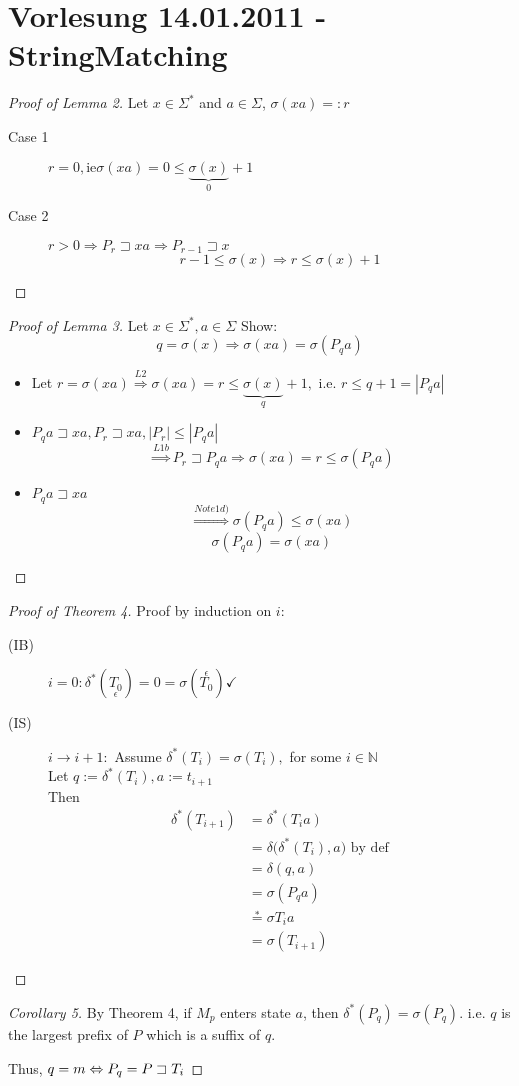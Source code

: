 \documentclass[12pt,oneside,a4paper,parskip=on,fleqn]{scrartcl}
\newcommand{\Ra}{\Rightarrow}
\begin{document}
\section*{Vorlesung 14.01.2011 - StringMatching} %
\label{sec:vorlesung_14_01_2011}
	
	\begin{proof}[Proof of Lemma 2]
		Let $x\in \Sigma^*$ and $a\in \Sigma$, $\sigma(xa) =: r$
		\begin{description}
			\item[Case 1] \( r=0,\text{ie} \sigma(xa) = 0 \leq \underbrace{\sigma(x)}_{0} + 1\)
			\item[Case 2] $r>0 \Rightarrow P_r\sqsupset xa \Rightarrow P_{r-1} \sqsupset x$
			\[
				r-1 \leq \sigma(x) \Rightarrow r\leq \sigma(x) + 1
			\]
		\end{description}
	\end{proof}

	\begin{proof}[Proof of Lemma 3]
		Let $x\in \Sigma^{*}, a\in \Sigma$
		Show: \[
			q=\sigma(x) \Ra \sigma(xa) = \sigma(P_q a)
		\]
		\begin{itemize}
			\item Let $r=\sigma(xa) \overset{L2}{\Ra} \sigma(xa) = r \leq \underbrace{\sigma(x)}_{q} +1,$ i.e. $r\leq q+1 = |P_q a|$
			\item $P_q a \sqsupset xa, P_r \sqsupset xa, |P_r| \leq |P_q a|$
			\[
				\overset{L1b}{\Ra} P_r \sqsupset P_q a \Ra \sigma(xa) = r \leq \sigma(P_q a)
			\]
			\item $P_q a \sqsupset xa$
			\[
				\overset{Note 1d)}{\Ra} \sigma(P_q a) \leq \sigma(xa)
			\]
			\[
				\sigma(P_q a) = \sigma(xa)
			\]
		\end{itemize}
	\end{proof}

	\begin{proof}[Proof of Theorem 4]
		Proof by induction on $i$:
		\begin{description}
			\item[(IB)] $i=0: \delta^*(\underset{\epsilon}{T_0}) = 0 = \sigma(\overset{\epsilon}{T_0}) \checkmark$
			\item[(IS)] $i\to i+1:$ Assume $\delta^*(T_i) = \sigma(T_i),$ for some $i\in\mathbb{N}$\\
			Let $q:= \delta^*(T_i), a:= t_{i+1}$\\
			Then\begin{align*}
				\delta^*\left(T_{i+1}\right) &= \delta^*(T_i a)\\
											 &= \delta \bigl( \delta^*(T_i), a \bigr) \text{ by def}\\
											 &= \delta(q,a)\\
											 &= \sigma(P_q a)\\
											 &\overset{*}{=} \sigma{T_i a}\\
											 &= \sigma(T_{i+1})
			\end{align*}
		\end{description}
	\end{proof}

	\begin{proof}[Corollary 5]
		By Theorem 4, if $M_p$ enters state $a$, then $\delta^*(P_q)=\sigma(P_q)$.
		i.e. $q$ is the largest prefix of $P$ which is a suffix of $q$.

		Thus, $q=m \Leftrightarrow P_q = P \sqsupset T_i$
	\end{proof}
\end{document}
